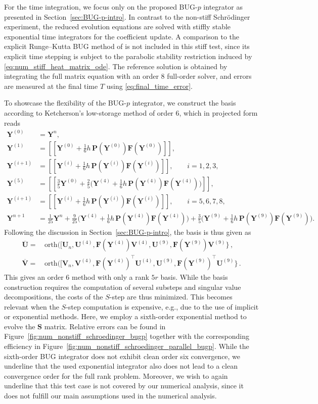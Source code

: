 \documentclass[preprint,runningheads]{svjour3}
\def\wt{\widetilde}
\def\wt{\overline}
\newcommand\bfF{{\mathbf F}}
\newcommand\bfP{{\mathbf P}}
\newcommand\bfS{{\mathbf S}}
\newcommand\bfU{{\mathbf U}}
\newcommand\bfV{{\mathbf V}}
\newcommand\bfY{{\mathbf Y}}
\begin{document}
For the time integration, we focus only on the proposed BUG-$p$ integrator as presented in Section~\ref{sec:BUG-p-intro}. In contrast to the
non-stiff Schr\"odinger experiment, the reduced evolution equations are solved
with stiffly stable exponential time integrators for the coefficient update. A comparison to the explicit Runge--Kutta BUG method of
\cite{nobile2025robust} is not included in this stiff test, since its explicit
time stepping is subject to the parabolic stability restriction induced by
\eqref{eq:num_stiff_heat_matrix_ode}. The reference solution is obtained by
integrating the full matrix equation with an order $8$ full-order
solver, and errors are measured at the final time $T$ using \eqref{eq:final_time_error}. 

 {To showcase the flexibility of the BUG-$p$ integrator, we construct the basis according to Ketcherson's low-storage method of order $6$, which in projected form reads
\begin{align*}
\bfY^{(0)} &= \bfY^n, \\[4pt]
\bfY^{(1)} &= [\![\bfY^{(0)} + \tfrac16 h\, \bfP(\bfY^{(0)})\bfF(\bfY^{(0)})]\!], \\
\bfY^{(i+1)} &= [\![\bfY^{(i)} + \tfrac16 h\, \bfP(\bfY^{(i)})\bfF(\bfY^{(i)})]\!], \qquad i = 1,2,3, \\[4pt]
\bfY^{(5)} &= [\![\tfrac35 \bfY^{(0)} + \tfrac25 \Big(\bfY^{(4)} + \tfrac16 h\, \bfP(\bfY^{(4)})\bfF(\bfY^{(4)})\Big)]\!], \\
\bfY^{(i+1)} &= [\![\bfY^{(i)} + \tfrac16 h\, \bfP(\bfY^{(i)})\bfF(\bfY^{(i)})]\!], \qquad i = 5,6,7,8, \\[6pt]
\bfY^{n+1} &= \frac1{25}\bfY^{n}+\frac9{25}\Big(\bfY^{(4)} + \tfrac16 h\, \bfP(\bfY^{(4)})\bfF(\bfY^{(4)})\Big)+\frac35\Big(\bfY^{(9)} + \tfrac16 h\, \bfP(\bfY^{(9)})\bfF(\bfY^{(9)})\Big).
\end{align*}
Following the discussion in Section~\ref{sec:BUG-p-intro}, the basis is thus given as
 \begin{align*}
    \wt\bfU =\,& \text{orth}([\bfU_n, \bfU^{(4)}, \bfF(\bfY^{(4)})\bfV^{(4)}, \bfU^{(9)}, \bfF(\bfY^{(9)})\bfV^{(9)}\}\,,\\
    \wt\bfV =\,& \text{orth}([\bfV_n, \bfV^{(4)}, \bfF(\bfY^{(4)})^{\top}\bfU^{(4)}, \bfU^{(9)}, \bfF(\bfY^{(9)})^{\top}\bfU^{(9)}\}\,.
\end{align*}  
This gives an order $6$ method with only a rank $5r$ basis. While the basis construction requires the computation of several substeps and singular value decompositions, the costs of the $S$-step are thus minimized. This becomes relevant when the $S$-step computation is expensive, e.g., due to the use of implicit or exponential methods. Here, we employ a sixth-order exponential method to evolve the $\bfS$ matrix. Relative errors can be found in Figure~\ref{fig:num_nonstiff_schroedinger_bugp} together with the corresponding efficiency in Figure~\ref{fig:num_nonstiff_schroedinger_parallel_bugp}.  While the sixth-order BUG integrator does not exhibit clean order six convergence, we underline that the used exponential integrator also does not lead to a clean convergence order for the full rank problem. Moreover, we wish to again underline that this test case is not covered by our numerical analysis, since it does not fulfill our main assumptions used in the numerical analysis.
}
\end{document}
